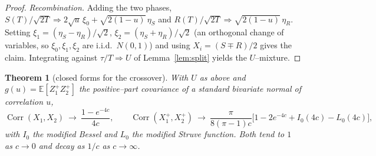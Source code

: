 \documentclass[11pt]{article}
\theoremstyle{plain}
\newtheorem{theorem}{Theorem}[section]
\theoremstyle{definition}
\theoremstyle{remark}
\DeclareMathOperator{\Corr}{Corr}\DeclareMathOperator{\cum}{cum}
\newcommand{\E}{\mathbb{E}}\newcommand{\PP}{\mathbb{P}}\newcommand{\dd}{\,\mathrm{d}}
\newcommand{\To}{\Rightarrow}\newcommand{\so}{\mathfrak{so}}
\begin{document}
\begin{proof}
\emph{Recombination.} Adding the two phases,
$S(T)/\sqrt{2T}\To2\sqrt u\,\xi_0+\sqrt{2(1-u)}\,\eta_S$ and
$R(T)/\sqrt{2T}\To\sqrt{2(1-u)}\,\eta_R$. Setting $\xi_1=(\eta_S-\eta_R)/\sqrt2$,
$\xi_2=(\eta_S+\eta_R)/\sqrt2$ (an orthogonal change of variables, so $\xi_0,\xi_1,\xi_2$
are i.i.d.\ $N(0,1)$) and using $X_i=(S\mp R)/2$ gives the claim. Integrating against
$\tau/T\To U$ of Lemma~\ref{lem:split} yields the $U$--mixture.
\end{proof}

\begin{theorem}[closed forms for the crossover]\label{thm:closed}
With $U$ as above and $g(u)=\E[Z_1^+Z_2^+]$ the positive--part covariance of a standard
bivariate normal of correlation $u$,
\[
  \Corr(X_1,X_2)\ \longrightarrow\ \frac{1-e^{-4c}}{4c},\qquad
  \Corr(X_1^+,X_2^+)\ \longrightarrow\
  \frac{\pi}{8(\pi-1)c}\big[1-2e^{-4c}+I_0(4c)-L_0(4c)\big],
\]
with $I_0$ the modified Bessel and $L_0$ the modified Struve function. Both tend to $1$
as $c\to0$ and decay as $1/c$ as $c\to\infty$.
\end{theorem}
\end{document}
